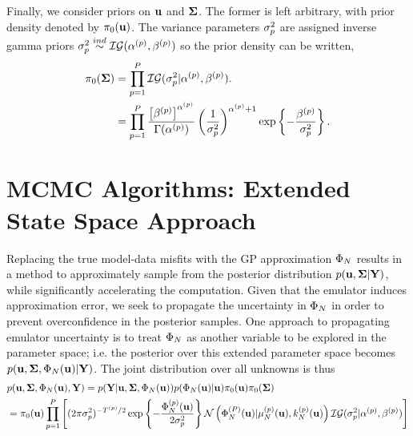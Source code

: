 \documentclass[12pt]{article}
\begin{document}
Finally, we consider priors on $\bpar$ and $\CovObs$. The former is left arbitrary, with prior density denoted by $\priorDens(\bpar)$. 
The variance parameters $\sdObs_{\objIdx}^2$ are assigned inverse gamma priors $\sdObs_{\objIdx}^2 \overset{ind}{\sim} \mathcal{IG}(\indexObj{\IGShape}, \indexObj{\IGScale})$ so the
prior density can be written, 
\begin{align}
\priorDens(\CovObs) 
&= \prod_{\objIdx = 1}^{\Nobj} \mathcal{IG}(\sdObs_{\objIdx}^2|\indexObj{\IGShape}, \indexObj{\IGScale}). \label{inv_gamma_prior} \\
&= \prod_{\objIdx = 1}^{\Nobj} \frac{\left[ \indexObj{\IGScale}\right]^{\indexObj{\IGShape}}}{\Gamma(\indexObj{\IGShape})} \left(\frac{1}{\sdObs^2_{\objIdx}}\right)^{\indexObj{\IGShape}+1} 
\exp\left\{-\frac{\indexObj{\IGScale}}{\sdObs^2_{\objIdx}} \right\}. \nonumber
\end{align}

\section{MCMC Algorithms: Extended State Space Approach}
Replacing the true model-data misfits with the GP approximation $\indexDesign[\Ndesign]{\SSR}$ results in a method to approximately sample from the posterior 
distribution $p(\bpar, \CovObs | \stateMat)$, while significantly accelerating the computation. Given that the emulator induces approximation error, we seek to 
propagate the uncertainty in $\indexDesign[\Ndesign]{\SSR}$ in order to prevent overconfidence in the posterior samples. 
One approach to propagating emulator uncertainty is to treat $\indexDesign[\Ndesign]{\SSR}$
as another variable to be explored in the parameter space; i.e. the posterior over this extended parameter space becomes 
$p(\bpar, \CovObs, \indexDesign[\Ndesign]{\SSR}(\bpar) | \stateMat)$. The joint distribution over all unknowns is thus 
\begin{align*}
&p(\bpar, \CovObs, \indexDesign[\Ndesign]{\SSR}(\bpar), \stateMat) = 
p(\stateMat | \bpar, \CovObs, \indexDesign[\Ndesign]{\SSR}(\bpar))p(\indexDesign[\Ndesign]{\SSR}(\bpar) | \bpar) \priorDens(\bpar) \priorDens(\CovObs) \\
&= \priorDens(\bpar) \prod_{\objIdx=1}^{\Nobj} \left[(2\pi\sdObs^2_{\objIdx})^{-\indexObj{\Ntime}/2} \exp\left\{-\frac{\SSRVecPredOut{\Ndesign}{\objIdx}(\bpar)}{2\sdObs^2_{\objIdx}} \right\} 
\Gaussian\left(\SSRVecPredOut{\Ndesign}{\Nobj}(\bpar) | \GPMeanPredOut{\Ndesign}{\objIdx}(\bpar), \GPKerPredOut{\Ndesign}{\objIdx}(\bpar)\right) \mathcal{IG}(\sdObs^2_{\objIdx}| \indexObj{\IGShape}, \indexObj{\IGScale}) \right] 
\end{align*}
\end{document}
